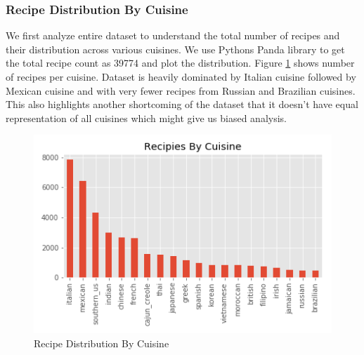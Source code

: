 \documentclass[sigconf]{acmart}
\begin{document}
\subsubsection{Recipe Distribution By Cuisine}
We first analyze entire dataset to understand the total number of recipes and their distribution across various cuisines. We use Pythons Panda library to get the total recipe count as 39774 and plot the distribution. Figure \ref{f:Number_of_recipes_by_cuisine} shows number of recipes per cuisine. Dataset is heavily dominated by Italian cuisine followed by Mexican cuisine and with very fewer recipes from Russian and Brazilian cuisines. This also highlights another shortcoming of the dataset that it doesn't have equal representation of all cuisines which might give us biased analysis.
\begin{figure}[!ht]
  \centering\includegraphics[width=\columnwidth]{images/Number_of_recipes_by_cuisine.png}
  \caption{Recipe Distribution By Cuisine }\label{f:Number_of_recipes_by_cuisine}
\end{figure}
\end{document}
